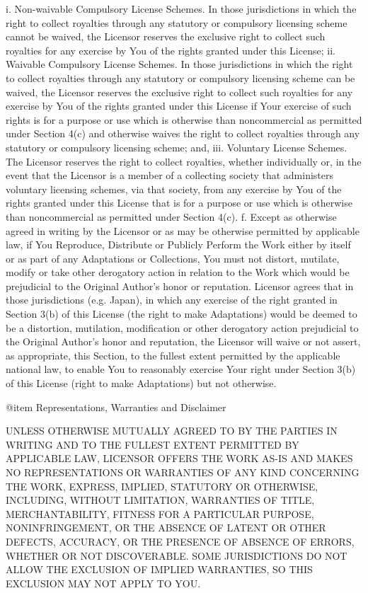      i. Non-waivable Compulsory License Schemes. In those jurisdictions in
        which the right to collect royalties through any statutory or
        compulsory licensing scheme cannot be waived, the Licensor
        reserves the exclusive right to collect such royalties for any
        exercise by You of the rights granted under this License;
    ii. Waivable Compulsory License Schemes. In those jurisdictions in
        which the right to collect royalties through any statutory or
        compulsory licensing scheme can be waived, the Licensor reserves
        the exclusive right to collect such royalties for any exercise by
        You of the rights granted under this License if Your exercise of
        such rights is for a purpose or use which is otherwise than
        noncommercial as permitted under Section 4(c) and otherwise waives
        the right to collect royalties through any statutory or compulsory
        licensing scheme; and,
   iii. Voluntary License Schemes. The Licensor reserves the right to
        collect royalties, whether individually or, in the event that the
        Licensor is a member of a collecting society that administers
        voluntary licensing schemes, via that society, from any exercise
        by You of the rights granted under this License that is for a
        purpose or use which is otherwise than noncommercial as permitted
        under Section 4(c).
 f. Except as otherwise agreed in writing by the Licensor or as may be
    otherwise permitted by applicable law, if You Reproduce, Distribute or
    Publicly Perform the Work either by itself or as part of any
    Adaptations or Collections, You must not distort, mutilate, modify or
    take other derogatory action in relation to the Work which would be
    prejudicial to the Original Author's honor or reputation. Licensor
    agrees that in those jurisdictions (e.g. Japan), in which any exercise
    of the right granted in Section 3(b) of this License (the right to
    make Adaptations) would be deemed to be a distortion, mutilation,
    modification or other derogatory action prejudicial to the Original
    Author's honor and reputation, the Licensor will waive or not assert,
    as appropriate, this Section, to the fullest extent permitted by the
    applicable national law, to enable You to reasonably exercise Your
    right under Section 3(b) of this License (right to make Adaptations)
    but not otherwise.

@item
Representations, Warranties and Disclaimer

UNLESS OTHERWISE MUTUALLY AGREED TO BY THE PARTIES IN WRITING AND TO THE
FULLEST EXTENT PERMITTED BY APPLICABLE LAW, LICENSOR OFFERS THE WORK AS-IS
AND MAKES NO REPRESENTATIONS OR WARRANTIES OF ANY KIND CONCERNING THE
WORK, EXPRESS, IMPLIED, STATUTORY OR OTHERWISE, INCLUDING, WITHOUT
LIMITATION, WARRANTIES OF TITLE, MERCHANTABILITY, FITNESS FOR A PARTICULAR
PURPOSE, NONINFRINGEMENT, OR THE ABSENCE OF LATENT OR OTHER DEFECTS,
ACCURACY, OR THE PRESENCE OF ABSENCE OF ERRORS, WHETHER OR NOT
DISCOVERABLE. SOME JURISDICTIONS DO NOT ALLOW THE EXCLUSION OF IMPLIED
WARRANTIES, SO THIS EXCLUSION MAY NOT APPLY TO YOU.

